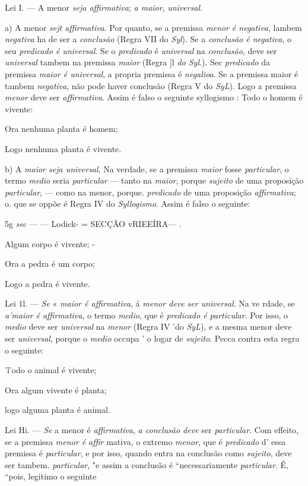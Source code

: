 Lei I. --- A menor \emph{seja affirmativa}; \emph{a maior}, \emph{universal}.

a) A menor \emph{sejt affirmativa}. Por quanto, se a premissa \emph{menor é negativa}, lambem \emph{negativa} ha de ser a \emph{conclusão} (Regra VII do \emph{Syl}). Se a \emph{conclusão é negativa}, o seu \emph{predicado é universal}. Se o \emph{predicado} é \emph{universal} na \emph{conclusão}, deve ser \emph{universal} tambem na premissa \emph{maior} (Regra ]l \emph{do Syl}.). Sec \emph{predicado} da premissa \emph{maior é universal}, a propria premissa é \emph{negalioa}. Se a premissa maior é tambem \emph{negativa}, não pode haver conclusão (Regra V do \emph{SyL}). Logo a premissa \emph{menor} deve ser \emph{affirmativa}. Assim é falso o seguinte syllogismo : \textbar{} Todo o homem é vivente:

Ora nenhuma planta é homem;

Logo nenhuma planta é vivente.

b) A \emph{maior seja universal}, Na verdade, se a premissa \emph{maior} fosse \emph{particular}, o termo \emph{medio} seria \emph{particular} --- tanto na \emph{maior}, porque \emph{sujeito} de uma proposição \emph{particular}, --- como na menor, porque. \emph{predicado} de uma proposição \emph{affirmativa}; o. que se oppõe é Regra IV do \emph{Syllogismo}. Assim é falso o seguinte:

5g \emph{sec} --- --- Lodick- = SECÇÃO vRIEEÍRA--- .

Algum corpo é vivente; -

Ora a pedra é um corpo;

Logo a pedra é vivente.

Lei 1l. --- \emph{Se} « \emph{maior é affirmativa}, á \emph{menor deve ser universal}. Na ve rdade, se \emph{a'maior é affirmativa}, o termo \emph{medio}, que é \emph{predicado é particular}. Por isso, o \emph{medio} deve ser \emph{universal} na \emph{menor} (Regra IV 'do \emph{SyL}), e a mesma menor deve ser \emph{universal}, porque o \emph{medio} occupa ' o logar de \emph{sujeito}. Pecca contra esta regra o seguinte:

'l'odo o animal é vivente;

Ora algum vivente é planta;

logo alguma planta é animal.

Lei Hi. --- \emph{Se} a menor é \emph{affirmativa}, \emph{a conclusão deve} ser \emph{particular}. Com effeito, se a premissa \emph{menor é affir} mativa, o extremo \emph{menor}, que é \emph{predicado} d' essa premissa é \emph{particular}, e por isso, quando entra na conclusão como \emph{sujeito}, deve ser tambem. \emph{particular}, "e assim a conclusão é “necessariamente \emph{particular}. É, “pois, legitimo o seguinte

